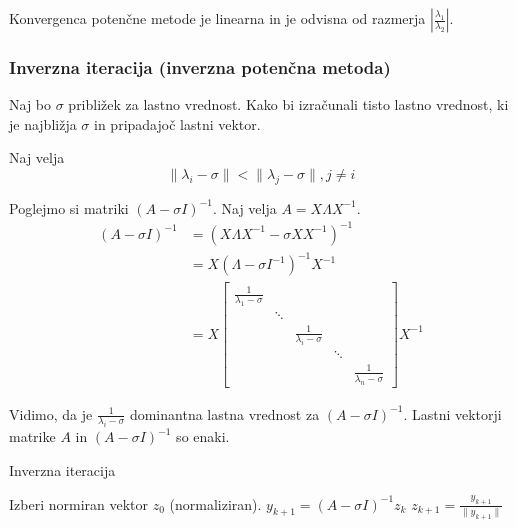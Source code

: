 \documentclass[a4paper,12pt]{article}
\DeclarePairedDelimiter\norm{\lVert}{\rVert}
\theoremstyle{definition}
\theoremstyle{remark}
\begin{document}
Konvergenca potenčne metode je linearna in je odvisna od razmerja $|\frac{\lambda_1}{\lambda_2}|$.

\subsubsection{Inverzna iteracija (inverzna potenčna metoda)}

Naj bo $\sigma$ približek za lastno vrednost. Kako bi izračunali tisto lastno vrednost, ki je najbližja $\sigma$ in pripadajoč lastni vektor.

Naj velja
\begin{equation*}
    \| \lambda_i - \sigma \| < \| \lambda_j - \sigma\|, j \neq i
\end{equation*}

Poglejmo si matriki $(A - \sigma I)^{-1}$. Naj velja $A = X \Lambda X^{-1}$.
\begin{align*}
    (A - \sigma I)^{-1} &= (X \Lambda X^{-1} - \sigma X X^{-1})^{-1} \\
                        &= X (\Lambda - \sigma I^{-1})^{-1} X^{-1} \\
                        &= X \begin{bmatrix}
                            \frac{1}{\lambda_1 - \sigma} & & & & \\
                            & \ddots & & & \\
                            & & \frac{1}{\lambda_i - \sigma} & & \\
                            & & & \ddots & \\
                            & & & & \frac{1}{\lambda_n - \sigma}
                        \end{bmatrix} X^{-1}
\end{align*}

Vidimo, da je $\frac{1}{\lambda_i - \sigma}$ dominantna lastna vrednost za $(A - \sigma I)^{-1}$. Lastni vektorji matrike $A$ in $(A - \sigma I)^{-1}$ so enaki.


\begin{algorithm}
    \caption{Inverzna iteracija}
    \begin{algorithmic}[1]
    \State Izberi normiran vektor $z_0$ (normaliziran).
        \State $y_{k+1} = (A - \sigma I)^{-1} z_k$ 
        \State $z_{k+1} = \frac{y_{k+1}}{\|y_{k+1}\|}$
    \EndWhile
    \end{algorithmic}
\end{algorithm}
\end{document}
